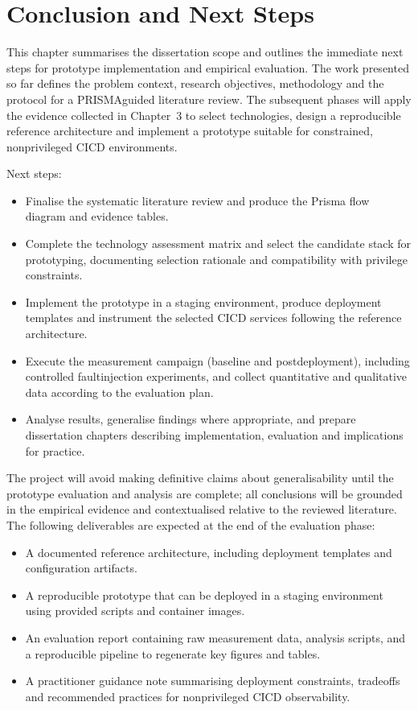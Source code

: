 
\chapter{Conclusion and Next Steps}
\label{chap:Chapter4}

This chapter summarises the dissertation scope and outlines the immediate next steps for prototype implementation and empirical evaluation. The work presented so far defines the problem context, research objectives, methodology and the protocol for a PRISMA\-guided literature review. The subsequent phases will apply the evidence collected in Chapter~3 to select technologies, design a reproducible reference architecture and implement a prototype suitable for constrained, non\-privileged \ac{CICD} environments.

Next steps:
\begin{itemize}
	\item Finalise the systematic literature review and produce the Prisma flow diagram and evidence tables.
	\item Complete the technology assessment matrix and select the candidate stack for prototyping, documenting selection rationale and compatibility with privilege constraints.
	\item Implement the prototype in a staging environment, produce deployment templates and instrument the selected \ac{CICD} services following the reference architecture.
	\item Execute the measurement campaign (baseline and post\-deployment), including controlled fault\-injection experiments, and collect quantitative and qualitative data according to the evaluation plan.
	\item Analyse results, generalise findings where appropriate, and prepare dissertation chapters describing implementation, evaluation and implications for practice.
\end{itemize}


The project will avoid making definitive claims about generalisability until the prototype evaluation and analysis are complete; all conclusions will be grounded in the empirical evidence and contextualised relative to the reviewed literature. The following deliverables are expected at the end of the evaluation phase:
\begin{itemize}
	\item A documented reference architecture, including deployment templates and configuration artifacts.
	\item A reproducible prototype that can be deployed in a staging environment using provided scripts and container images.
	\item An evaluation report containing raw measurement data, analysis scripts, and a reproducible pipeline to regenerate key figures and tables.
	\item A practitioner guidance note summarising deployment constraints, trade\-offs and recommended practices for non\-privileged \ac{CICD} observability.
\end{itemize}

